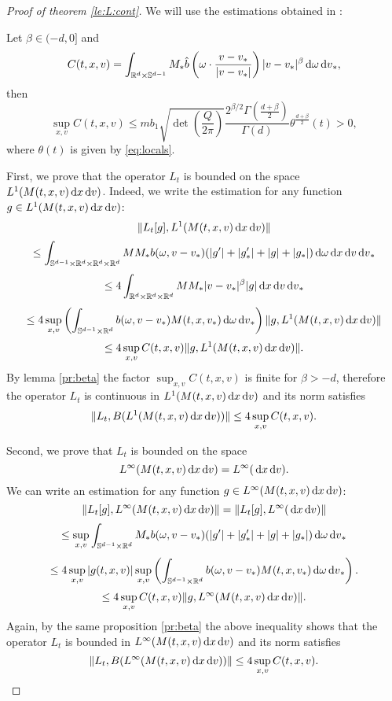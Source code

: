 \begin{subappendices}
\begin{proof}[Proof of theorem \ref{le:L:cont}] %
	We will use the estimations obtained in \cite{FG}:
	\begin{lemma}
	\label{pr:beta}
	Let $\beta\in(-d,0]$ and
	\[C(t,x,v) = \int_{{\mathbb R^d}\times{\mathbb S^{d-1}}} M_* \hat b\left(\omega \cdot \frac{v-v_*}{|v-v_*|}\right)|v-v_*|^{ \beta}{\,\mathrm{d} \omega}{\,\mathrm{d} v}_* ,\]
	then 
	 \[\sup_{x,v}C(t,x,v) \le  m  b_1 \sqrt{\det\left(\frac{Q}{2 \pi }\right)} \frac{2^{\beta/2 }\Gamma\left(\frac{d+\beta}{2} \right)}{\Gamma\left( d \right)}\theta^{\frac{d +\beta}{2} }(t)>0,\]
	where $\theta(t)$ is given by \eqref{eq:locals}.
	\end{lemma}

	First, we prove that the operator $L_t$ is bounded on the space\\ $L^1(M(t,x,v){\,\mathrm{d} x}{\,\mathrm{d} v})$. Indeed, we write the estimation for any function $g\in L^1(M(t,x,v){\,\mathrm{d} x}{\,\mathrm{d} v})$:
	\[
		\|L_t[g],L^1(M(t,x,v){\,\mathrm{d} x}{\,\mathrm{d} v})\|\]\[\le \int_{{\mathbb S^{d-1}}\times{\mathbb R^d}\times{{\mathbb R^d}\times{\mathbb R^d}}}^{}MM_*b(\omega,v-v_*)(|g'|+|g'_*|+|g|+|g_*|){\,\mathrm{d} \omega}{\,\mathrm{d} x}{\,\mathrm{d} v}{\,\mathrm{d} v}_*
	\]
	\[
		\le 4\int_{{\mathbb R^d}\times{{\mathbb R^d}\times{\mathbb R^d}}}MM_*|v-v_*|^{\beta}|g|{\,\mathrm{d} x}{\,\mathrm{d} v}{\,\mathrm{d} v}_*
	\]
	\[
		\le 4\sup_{x,v}\left(\int_{{\mathbb S^{d-1}}\times{\mathbb R^d}} b(\omega, v-v_* ) M(t,x,v_*){\,\mathrm{d} \omega}{\,\mathrm{d} v}_*\right) \|g,L^1(M(t,x,v){\,\mathrm{d} x}{\,\mathrm{d} v})\|
	\]
	\[
		 \le 4\sup_{x,v} C(t,x,v) \|g,L^1(M(t,x,v){\,\mathrm{d} x}{\,\mathrm{d} v})\|.
	\]
	By   lemma \ref{pr:beta} the factor $\sup_{x,v} C(t,x,v) $ is finite for $\beta>-d$, therefore the operator $L_t$ is continuous in  $L^1(M(t,x,v){\,\mathrm{d} x}{\,\mathrm{d} v})$ and its norm satisfies
	\[\|L_t ,B(L^1(M(t,x,v){\,\mathrm{d} x}{\,\mathrm{d} v}))\|\le 4   \sup_{x,v} C(t,x,v). \]

	Second, we prove that $L_t$ is bounded on the space  \[ L^\infty(M(t,x,v){\,\mathrm{d} x}{\,\mathrm{d} v})=L^\infty({\,\mathrm{d} x}{\,\mathrm{d} v}).\] We can write an estimation for any function $g\in L^\infty(M(t,x,v){\,\mathrm{d} x}{\,\mathrm{d} v})$:
	\[
		\|L_t[g],L^\infty(M(t,x,v){\,\mathrm{d} x}{\,\mathrm{d} v})\|=\|L_t[g],L^\infty({\,\mathrm{d} x}{\,\mathrm{d} v})\|
	\]
	\[
		\le \sup_{x,v}\int_{{\mathbb S^{d-1}}\times{\mathbb R^d}}M_*b(\omega,v-v_*)(|g'|+|g'_*|+|g|+|g_*|){\,\mathrm{d} \omega}{\,\mathrm{d} v}_*
	\]
	\[
		\le 4 \sup_{x,v}|g(t,x,v)|\sup_{x,v}\left(\int_{{\mathbb S^{d-1}}\times{\mathbb R^d}} b(\omega,v-v_*) M(t,x,v_*){\,\mathrm{d} \omega}{\,\mathrm{d} v}_*\right).
	\]
	\[
		\le 4 \sup_{x,v} C(t,x,v) \|g,L^\infty(M(t,x,v){\,\mathrm{d} x}{\,\mathrm{d} v})\|.
	\]
	Again, by the same proposition \ref{pr:beta} the above inequality shows that the operator $L_t$ is bounded in $ L^\infty(M(t,x,v){\,\mathrm{d} x}{\,\mathrm{d} v})$ and its norm satisfies
	\[\|L_t ,B(L^\infty(M(t,x,v){\,\mathrm{d} x}{\,\mathrm{d} v}))\|\le 4  \sup_{x,v} C(t,x,v). \]
	

\end{proof}
\end{subappendices}
